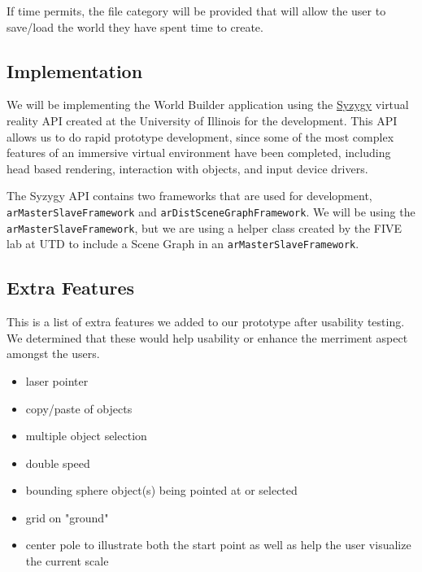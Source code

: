 If time permits, the file category will be provided that will allow the user to save/load the world they have spent time to create.

\subsection{Implementation}
We will be implementing the World Builder application using the \href{http://syzygy.isl.uiuc.edu/szg/szgsrc/doc/index.html}{Syzygy} virtual reality API created at the University of Illinois for the development.
This API allows us to do rapid prototype development, since some of the most complex features of an immersive virtual environment have been completed, including head based rendering, interaction with objects, and input device drivers.

The Syzygy API contains two frameworks that are used for development, \verb|arMasterSlaveFramework| and \verb|arDistSceneGraphFramework|.
We will be using the \verb|arMasterSlaveFramework|, but we are using a helper class created by the FIVE lab at UTD to include a Scene Graph in an \verb|arMasterSlaveFramework|.

\subsection{Extra Features}
This is a list of extra features we added to our prototype after usability testing. We determined that these would help usability or enhance the merriment aspect amongst the users.

\begin{itemize}
    \item laser pointer
    \item copy/paste of objects
    \item multiple object selection
    \item double speed
    \item bounding sphere object(s) being pointed at or selected
    \item grid on "ground"
    \item center pole to illustrate both the start point as well as help the user visualize the current scale
\end{itemize}

